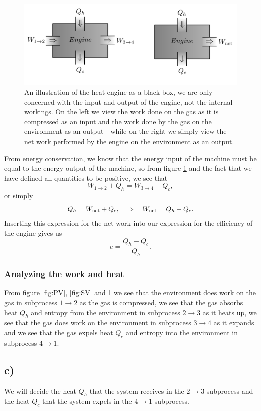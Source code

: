 \documentclass[a4paper, 11pt, titlepage, english]{article}
\begin{document}
\begin{figure}[t]
\centering
\includegraphics[width=\textwidth]{Engine}
\caption{An illustration of the heat engine as a black box, we are only concerned with the input and output of the engine, not the internal workings. On the left we view the work done on the gas as it is compressed as an input and the work done by the gas on the environment as an output---while on the right we simply view the net work performed by the engine on the environment as an output. \label{fig:blackbox}}
\end{figure}

From energy conservation, we know that the energy input of the machine must be equal to the energy output of the machine, so from figure \ref{fig:blackbox} and the fact that we have defined all quantities to be positive, we see that
$$W_{1\rightarrow2} + Q_h = W_{3\rightarrow4} + Q_c,$$
or simply
$$Q_h = W_{\rm net} + Q_c, \quad \Rightarrow \quad W_{\rm net} = Q_h - Q_c.$$
Inserting this expression for the net work into our expression for the efficiency of the engine gives us
$$e = \frac{Q_h - Q_c}{Q_h}.$$

\subsubsection*{Analyzing the work and heat}
From figure \ref{fig:PV}, \ref{fig:SV} and \ref{fig:blackbox} we see that the environment does work on the gas in subprocess $1\rightarrow2$ as the gas is compressed, we see that the gas absorbs heat $Q_h$ and entropy from the environment in subprocess $2\rightarrow3$ as it heats up, we see that the gas does work on the environment in subprocess $3\rightarrow4$ as it expands and we see that the gas expels heat $Q_c$ and entropy into the environment in subprocess $4\rightarrow1$. 

\subsection*{c)}
We will decide the heat $Q_h$ that the system receives in the $2\rightarrow 3$ subprocess and the heat $Q_c$ that the system expels in the $4\rightarrow1$ subprocess. 
\end{document}
